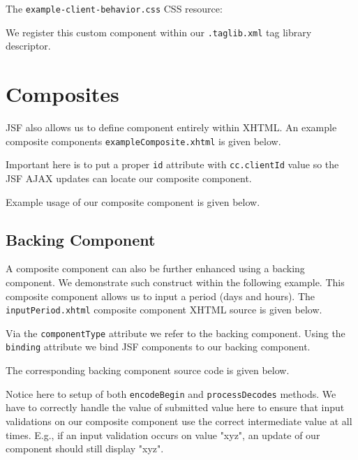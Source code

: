 The \texttt{example-client-behavior.css} CSS resource:


We register this custom component within our \texttt{.taglib.xml} tag library descriptor.


\section{Composites}
JSF also allows us to define component entirely within XHTML.
An example composite components \texttt{exampleComposite.xhtml} is given below.

Important here is to put a proper \texttt{id} attribute with \texttt{cc.clientId} value so the JSF AJAX updates can locate our composite component.

Example usage of our composite component is given below.


\subsection{Backing Component}
A composite component can also be further enhanced using a backing component.
We demonstrate such construct within the following example.
This composite component allows us to input a period (days and hours).
The \texttt{inputPeriod.xhtml} composite component XHTML source is given below.

Via the \texttt{componentType} attribute we refer to the backing component.
Using the \texttt{binding} attribute we bind JSF components to our backing component.

The corresponding backing component source code is given below.

Notice here to setup of both \texttt{encodeBegin} and \texttt{processDecodes} methods.
We have to correctly handle the value of submitted value here to ensure that input validations on our composite component use the correct intermediate value at all times. E.g., if an input validation occurs on value "xyz", an update of our component should still display "xyz".

